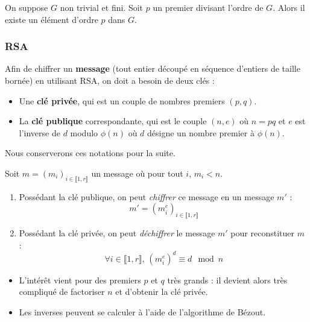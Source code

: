 	\begin{application}
		On suppose $G$ non trivial et fini. Soit $p$ un premier divisant l'ordre de $G$. Alors il existe un élément d'ordre $p$ dans $G$.
	\end{application}
	
	\subsubsection{RSA}
	
	
	\begin{definition}
		Afin de chiffrer un \textbf{message} (tout entier découpé en séquence d'entiers de taille bornée) en utilisant RSA, on doit a besoin de deux clés :
		\begin{itemize}
			\item Une \textbf{clé privée}, qui est un couple de nombres premiers $(p,q)$.
			\item La \textbf{clé publique} correspondante, qui est le couple $(n,e)$ où $n = pq$ et $e$ est l'inverse de $d$ modulo $\phi(n)$ où $d$ désigne un nombre premier à $\phi(n)$.
		\end{itemize}
	\end{definition}
	
	Nous conserverons ces notations pour la suite.
	
	\begin{theorem}
		Soit $m = (m_i)_{i \in \llbracket 1, r \rrbracket}$ un message où pour tout $i$, $m_i < n$.
		\begin{enumerate}[label=(\roman*)]
			\item Possédant la clé publique, on peut \textit{chiffrer} ce message en un message $m'$ :
			\[ m' = (m_i^e)_{i \in \llbracket 1, r \rrbracket} \]
			\item Possédant la clé privée, on peut \textit{déchiffrer} le message $m'$ pour reconstituer $m$ :
			\[ \forall i \in \llbracket 1, r \rrbracket, \, (m_i^e)^d \equiv d \mod n \]
		\end{enumerate}
	\end{theorem}
	
	\begin{remark}
		\begin{itemize}
			\item L'intérêt vient pour des premiers $p$ et $q$ très grands : il devient alors très compliqué de factoriser $n$ et d'obtenir la clé privée.
			\item Les inverses peuvent se calculer à l'aide de l'algorithme de Bézout.
		\end{itemize}
	\end{remark}

